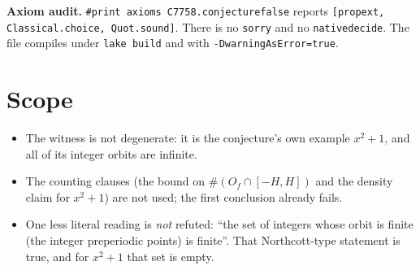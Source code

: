 \documentclass[11pt]{article}
\renewcommand{\_}{\oldus\allowbreak}
\theoremstyle{definition}
\theoremstyle{remark}
\begin{document}
\textbf{Axiom audit.} \texttt{\#print axioms C7758.conjecture\_7758\_false} reports
\texttt{[propext, Classical.choice, Quot.sound]}. There is no \texttt{sorry} and no
\texttt{native\_decide}. The file compiles under \texttt{lake build} and with
\texttt{-DwarningAsError=true}.

\section{Scope}

\begin{itemize}
\item The witness is not degenerate: it is the conjecture's own example $x^2+1$, and all of its integer
orbits are infinite.
\item The counting clauses (the bound on $\#(O_f \cap [-H,H])$ and the density claim for $x^2+1$) are
not used; the first conclusion already fails.
\item One less literal reading is \emph{not} refuted: ``the set of integers whose orbit is finite
(the integer preperiodic points) is finite''. That Northcott-type statement is true, and for $x^2+1$
that set is empty.
\end{itemize}
\end{document}
